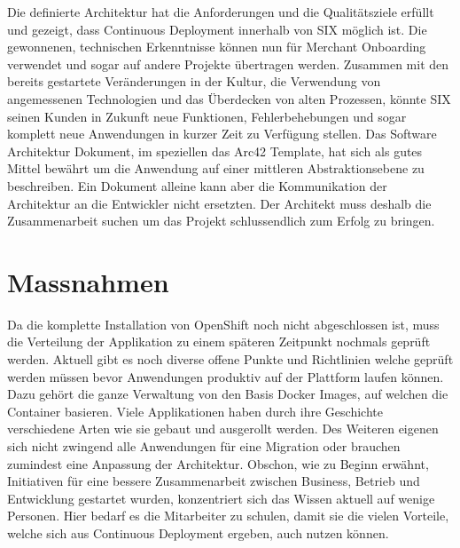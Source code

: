 Die definierte Architektur hat die Anforderungen und die Qualitätsziele erfüllt und gezeigt, dass Continuous Deployment innerhalb von SIX möglich ist. Die gewonnenen, technischen Erkenntnisse können nun für Merchant Onboarding verwendet und sogar auf andere Projekte übertragen werden. Zusammen mit den bereits gestartete Veränderungen in der Kultur, die Verwendung von angemessenen Technologien und das Überdecken von alten Prozessen, könnte SIX seinen Kunden in Zukunft neue Funktionen, Fehlerbehebungen und sogar komplett neue Anwendungen in kurzer Zeit zu Verfügung stellen.\newline
Das Software Architektur Dokument, im speziellen das Arc42 Template, hat sich als gutes Mittel bewährt um die Anwendung auf einer mittleren Abstraktionsebene zu beschreiben. Ein Dokument alleine kann aber die Kommunikation der Architektur an die Entwickler nicht ersetzten. Der Architekt muss deshalb die Zusammenarbeit suchen um das Projekt schlussendlich zum Erfolg zu bringen.

\chapter{Massnahmen}

Da die komplette Installation von OpenShift noch nicht abgeschlossen ist, muss die Verteilung der Applikation zu einem späteren Zeitpunkt nochmals geprüft werden. Aktuell gibt es noch diverse offene Punkte und Richtlinien welche geprüft werden müssen bevor Anwendungen produktiv auf der Plattform laufen können. Dazu gehört die ganze Verwaltung von den Basis Docker Images, auf welchen die Container basieren. Viele Applikationen haben durch ihre Geschichte verschiedene Arten wie sie gebaut und ausgerollt werden. Des Weiteren eigenen sich nicht zwingend alle Anwendungen für eine Migration oder brauchen zumindest eine Anpassung der Architektur. Obschon, wie zu Beginn erwähnt, Initiativen für eine bessere Zusammenarbeit zwischen Business, Betrieb und Entwicklung gestartet wurden, konzentriert sich das Wissen aktuell auf wenige Personen. Hier bedarf es die Mitarbeiter zu schulen, damit sie die vielen Vorteile, welche sich aus Continuous Deployment ergeben, auch nutzen können.